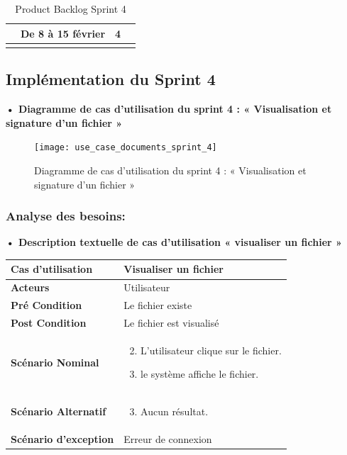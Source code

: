 \begin{longtable}{|p{4cm}|p{7cm}|p{2cm}|p{2cm}|}
\begin{itemize}
  \end{itemize}
  &
  De 8 à 15 février  
  &
  4
  \\
  \hline
  \caption{Product Backlog Sprint 4}
  \label{tab:product_backlog_sprint_4}



\end{longtable}


\subsection{Implémentation du Sprint 4}
\textbf{•	Diagramme de cas d'utilisation du sprint 4 : « Visualisation et signature d'un fichier »}

\begin{figure}[H]
  \centering
  \texttt{[image: use\_case\_documents\_sprint\_4]}
  \caption{Diagramme de cas d'utilisation du sprint 4 : « Visualisation et signature d'un fichier »}
  \label{fig:UseCaseDiagram}
\end{figure}

\subsubsection{Analyse des besoins:}
\textbf{•	Description textuelle de cas d'utilisation « visualiser un fichier  »}

\begin{longtable}{|p{5cm}|p{10cm}|}
\hline
\textbf{Cas d'utilisation}&Visualiser un fichier\\
\hline
\textbf{Acteurs}&Utilisateur\\
\hline
\textbf{Pré Condition}&Le fichier existe\\
\hline
\textbf{Post Condition}&Le fichier est visualisé\\
\hline
\textbf{Scénario Nominal}&
\vspace{-\baselineskip}
\begin{enumerate}
    \setcounter{enumi}{1}
  \item L'utilisateur clique sur le fichier.
  \item le système affiche le fichier.
\end{enumerate}\\
\hline
\textbf{Scénario Alternatif}&
\vspace{-\baselineskip}
\begin{enumerate}
    \setcounter{enumi}{2}
    \item Aucun résultat.
\end{enumerate}\\
\hline
\textbf{Scénario d'exception}&Erreur de connexion\\
\hline
\end{longtable}

